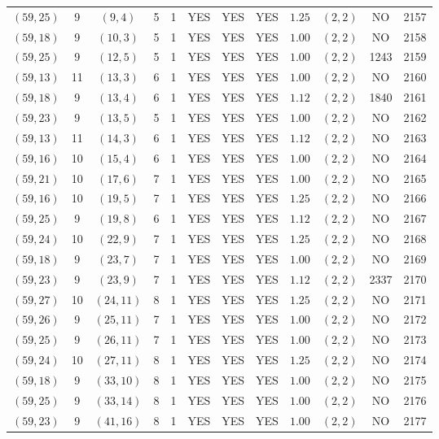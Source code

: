 \begin{longtable}{|c|c|c|c|c|c|c|c|c|c|c|c|}
$(59,25)$ & 9 & $(9,4)$ & 5 & 1 & YES & YES & YES & $1.25$ & $(2,2)$ & NO & 2157\\
$(59,18)$ & 9 & $(10,3)$ & 5 & 1 & YES & YES & YES & $1.00$ & $(2,2)$ & NO & 2158\\
$(59,25)$ & 9 & $(12,5)$ & 5 & 1 & YES & YES & YES & $1.00$ & $(2,2)$ & 1243 & 2159\\
$(59,13)$ & 11 & $(13,3)$ & 6 & 1 & YES & YES & YES & $1.00$ & $(2,2)$ & NO & 2160\\
$(59,18)$ & 9 & $(13,4)$ & 6 & 1 & YES & YES & YES & $1.12$ & $(2,2)$ & 1840 & 2161\\
$(59,23)$ & 9 & $(13,5)$ & 5 & 1 & YES & YES & YES & $1.00$ & $(2,2)$ & NO & 2162\\
$(59,13)$ & 11 & $(14,3)$ & 6 & 1 & YES & YES & YES & $1.12$ & $(2,2)$ & NO & 2163\\
$(59,16)$ & 10 & $(15,4)$ & 6 & 1 & YES & YES & YES & $1.00$ & $(2,2)$ & NO & 2164\\
$(59,21)$ & 10 & $(17,6)$ & 7 & 1 & YES & YES & YES & $1.00$ & $(2,2)$ & NO & 2165\\
$(59,16)$ & 10 & $(19,5)$ & 7 & 1 & YES & YES & YES & $1.25$ & $(2,2)$ & NO & 2166\\
$(59,25)$ & 9 & $(19,8)$ & 6 & 1 & YES & YES & YES & $1.12$ & $(2,2)$ & NO & 2167\\
$(59,24)$ & 10 & $(22,9)$ & 7 & 1 & YES & YES & YES & $1.25$ & $(2,2)$ & NO & 2168\\
$(59,18)$ & 9 & $(23,7)$ & 7 & 1 & YES & YES & YES & $1.00$ & $(2,2)$ & NO & 2169\\
$(59,23)$ & 9 & $(23,9)$ & 7 & 1 & YES & YES & YES & $1.12$ & $(2,2)$ & 2337 & 2170\\
$(59,27)$ & 10 & $(24,11)$ & 8 & 1 & YES & YES & YES & $1.25$ & $(2,2)$ & NO & 2171\\
$(59,26)$ & 9 & $(25,11)$ & 7 & 1 & YES & YES & YES & $1.00$ & $(2,2)$ & NO & 2172\\
$(59,25)$ & 9 & $(26,11)$ & 7 & 1 & YES & YES & YES & $1.00$ & $(2,2)$ & NO & 2173\\
$(59,24)$ & 10 & $(27,11)$ & 8 & 1 & YES & YES & YES & $1.25$ & $(2,2)$ & NO & 2174\\
$(59,18)$ & 9 & $(33,10)$ & 8 & 1 & YES & YES & YES & $1.00$ & $(2,2)$ & NO & 2175\\
$(59,25)$ & 9 & $(33,14)$ & 8 & 1 & YES & YES & YES & $1.00$ & $(2,2)$ & NO & 2176\\
$(59,23)$ & 9 & $(41,16)$ & 8 & 1 & YES & YES & YES & $1.00$ & $(2,2)$ & NO & 2177\\

\end{longtable}

